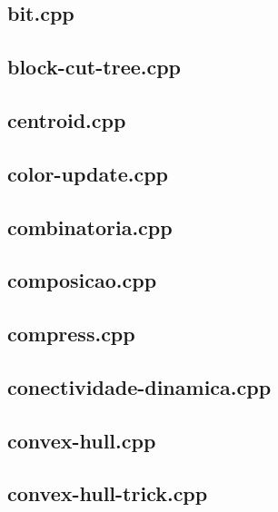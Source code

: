 \documentclass[a4paper,12pt]{article}
\begin{document}
\subsection{bit.cpp}


\subsection{block-cut-tree.cpp}


\subsection{centroid.cpp}


\subsection{color-update.cpp}


\subsection{combinatoria.cpp}


\subsection{composicao.cpp}


\subsection{compress.cpp}


\subsection{conectividade-dinamica.cpp}


\subsection{convex-hull.cpp}


\subsection{convex-hull-trick.cpp}

\end{document}
